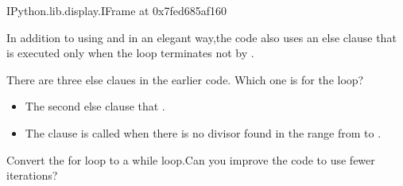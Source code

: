 \documentclass[letterpaper,10pt,english]{sphinxmanual}
\begin{document}
\begin{sphinxVerbatim}[commandchars=\\\{\}]
\PYGZlt{}IPython.lib.display.IFrame at 0x7fed685af160\PYGZgt{}
\end{sphinxVerbatim}

In addition to using  and  in an elegant way,the code also uses an else clause that is executed only when the loop terminates  not by .

 There are three else claues in the earlier code. Which one is for the loop?
\begin{itemize}
\item {} 
The second else clause that .

\item {} 
The clause is called when there is no divisor found in the range from  to .

\end{itemize}

 Convert the for loop to a while loop.Can you improve the code to use fewer iterations?

\begin{sphinxVerbatim}[commandchars=\\\{\}]
 
     
          
          
            
               
                  
\end{sphinxVerbatim}
\end{document}
